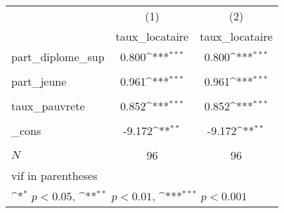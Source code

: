 {
\def\sym#1{\ifmmode^{#1}\else\(^{#1}\)\fi}
\begin{tabular}{l*{2}{c}}
\hline\hline
            &\multicolumn{1}{c}{(1)}&\multicolumn{1}{c}{(2)}\\
            &\multicolumn{1}{c}{taux\_locataire}&\multicolumn{1}{c}{taux\_locataire}\\
\hline
part\_diplome\_sup&       0.800\sym{***}&       0.800\sym{***}\\
            &                     &                     \\
[1em]
part\_jeune  &       0.961\sym{***}&       0.961\sym{***}\\
            &                     &                     \\
[1em]
taux\_pauvrete&       0.852\sym{***}&       0.852\sym{***}\\
            &                     &                     \\
[1em]
\_cons      &      -9.172\sym{**} &      -9.172\sym{**} \\
            &                     &                     \\
\hline
\(N\)       &          96         &          96         \\
\hline\hline
\multicolumn{3}{l}{\footnotesize vif in parentheses}\\
\multicolumn{3}{l}{\footnotesize \sym{*} \(p<0.05\), \sym{**} \(p<0.01\), \sym{***} \(p<0.001\)}\\
\end{tabular}
}

